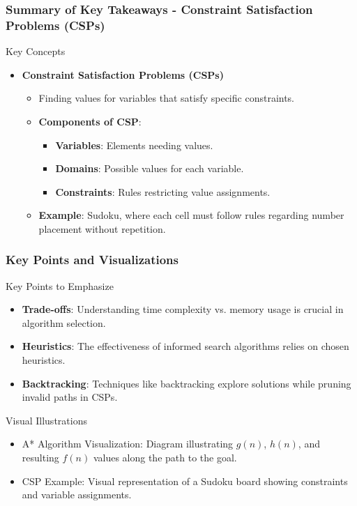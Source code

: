 \documentclass[aspectratio=169]{beamer}
\begin{document}
\begin{frame}[fragile]
    \frametitle{Summary of Key Takeaways - Constraint Satisfaction Problems (CSPs)}
    \begin{block}{Key Concepts}
        \begin{itemize}
            \item \textbf{Constraint Satisfaction Problems (CSPs)}
            \begin{itemize}
                \item Finding values for variables that satisfy specific constraints.
                \item \textbf{Components of CSP}:
                \begin{itemize}
                    \item \textbf{Variables}: Elements needing values.
                    \item \textbf{Domains}: Possible values for each variable.
                    \item \textbf{Constraints}: Rules restricting value assignments.
                \end{itemize}
                \item \textbf{Example}: Sudoku, where each cell must follow rules regarding number placement without repetition.
            \end{itemize}
        \end{itemize}
    \end{block}
\end{frame}

\begin{frame}[fragile]
    \frametitle{Key Points and Visualizations}
    \begin{block}{Key Points to Emphasize}
        \begin{itemize}
            \item \textbf{Trade-offs}: Understanding time complexity vs. memory usage is crucial in algorithm selection.
            \item \textbf{Heuristics}: The effectiveness of informed search algorithms relies on chosen heuristics.
            \item \textbf{Backtracking}: Techniques like backtracking explore solutions while pruning invalid paths in CSPs.
        \end{itemize}
    \end{block}
    
    \begin{block}{Visual Illustrations}
        \begin{itemize}
            \item A* Algorithm Visualization: Diagram illustrating $g(n)$, $h(n)$, and resulting $f(n)$ values along the path to the goal.
            \item CSP Example: Visual representation of a Sudoku board showing constraints and variable assignments.
        \end{itemize}
    \end{block}
\end{frame}
\end{document}
